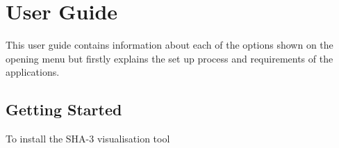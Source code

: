 \chapter*{User Guide}
This user guide contains information about each of the options shown on the opening menu but firstly explains the set up process and requirements of the applications.
\section*{Getting Started}
To install the SHA-3 visualisation tool 